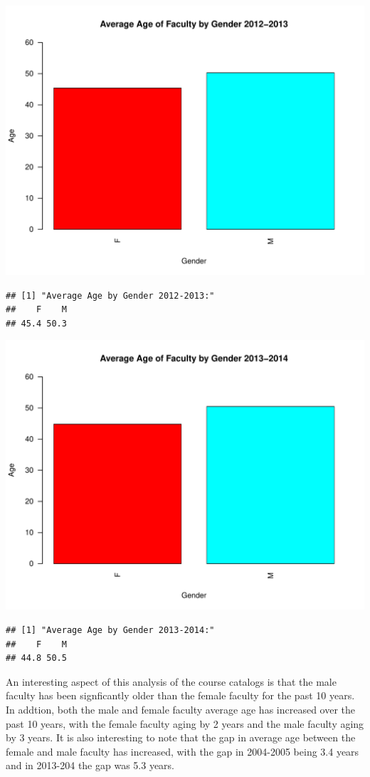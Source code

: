 \documentclass[12pt,a4paper]{article}\usepackage[]{graphicx}\usepackage[]{color}
\makeatletter
\def\maxwidth{ %
  \ifdim\Gin@nat@width>\linewidth
    \linewidth
  \else
    \Gin@nat@width
  \fi
}
\newenvironment{kframe}{%
 \def\at@end@of@kframe{}%
 \ifinner\ifhmode%
  \def\at@end@of@kframe{\end{minipage}}%
  \begin{minipage}{\columnwidth}%
 \fi\fi%
 \def\FrameCommand##1{\hskip\@totalleftmargin \hskip-\fboxsep
 \colorbox{shadecolor}{##1}\hskip-\fboxsep
     \hskip-\linewidth \hskip-\@totalleftmargin \hskip\columnwidth}%
 \MakeFramed {\advance\hsize-\width
   \@totalleftmargin\z@ \linewidth\hsize
   \@setminipage}}%
 {\par\unskip\endMakeFramed%
 \at@end@of@kframe}
\newenvironment{knitrout}{}{} %
\theoremstyle{definition}
\makeatother
\begin{document}
\begin{knitrout}
\includegraphics[width=\maxwidth]{figure/unnamed-chunk-11-9} 
\begin{kframe}\begin{verbatim}
## [1] "Average Age by Gender 2012-2013:"
##    F    M 
## 45.4 50.3
\end{verbatim}
\end{kframe}
\includegraphics[width=\maxwidth]{figure/unnamed-chunk-11-10} 
\begin{kframe}\begin{verbatim}
## [1] "Average Age by Gender 2013-2014:"
##    F    M 
## 44.8 50.5
\end{verbatim}
\end{kframe}
\end{knitrout}
\bigskip
An interesting aspect of this analysis of the course catalogs is that the male faculty has been signficantly older than the female faculty for the past 10 years. In addtion, both the male and female faculty average age has increased over the past 10 years, with the female faculty aging by 2 years and the male faculty aging by 3 years. It is also interesting to note that the gap in average age between the female and male faculty has increased, with the gap in 2004-2005 being 3.4 years and in 2013-204 the gap was 5.3 years.
\end{document}
